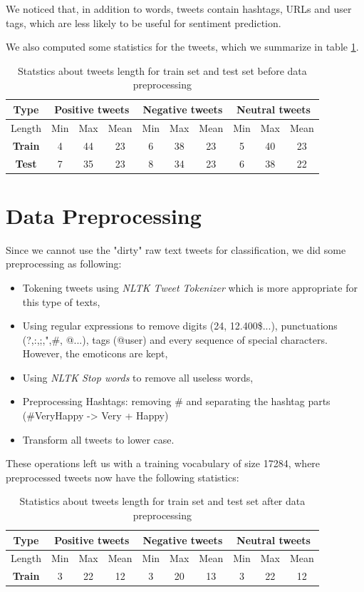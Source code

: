 \documentclass[a4paper,english,12pt]{article}
\begin{document}
We noticed that, in addition to words, tweets contain hashtags, URLs and user tags, which are less likely to be useful for sentiment prediction. 

We also computed some statistics for the tweets, which we summarize in table \ref{stat}.


\begin{table}[H]\centering
	\begin{tabular}{|c|c c c|c c c|c c c|}
		\hline \textbf{Type}  & \multicolumn{3}{|c|}{\textbf{Positive tweets}} & \multicolumn{3}{|c|}{\textbf{Negative tweets}} & \multicolumn{3}{|c|}{\textbf{Neutral tweets}}\\    \hline
		 Length & Min & Max & Mean & Min & Max & Mean & Min & Max & Mean\\   \hline
		\textbf{Train} & 4&44&23&6&38&23&5&40&23 \\
		\textbf{Test} & 7&35&23&8&34&23&6&38&22 \\
		\hline
	\end{tabular}
	\caption{Statstics about tweets length for train set and test set before data preprocessing}
	\label{stat}
\end{table}


\section{Data Preprocessing}
Since we cannot use the "dirty" raw text tweets for classification, we did some preprocessing as following:
\begin{itemize}
	\item Tokening tweets using \emph{NLTK Tweet Tokenizer} which is more appropriate for this type of texts,
	\item Using regular expressions to remove digits (24, 12.400\$...), punctuations (?,:,;,",\#, @...), tags (@user) and every sequence of special characters. However, the emoticons are kept,
	\item Using \emph{NLTK Stop words} to remove all useless words,
	\item Preprocessing Hashtags: removing \# and separating the hashtag parts (\#VeryHappy -> Very + Happy)
	\item Transform all tweets to lower case. 
\end{itemize}

These operations left us with a training vocabulary of size 17284, where preprocessed tweets now have the following statistics:


\begin{table}[H]\centering
	\begin{tabular}{|c|c c c|c c c|c c c|}
		\hline \textbf{Type}  & \multicolumn{3}{|c|}{\textbf{Positive tweets}} & \multicolumn{3}{|c|}{\textbf{Negative tweets}} & \multicolumn{3}{|c|}{\textbf{Neutral tweets}}\\    \hline
		Length & Min & Max & Mean & Min & Max & Mean & Min & Max & Mean\\   \hline
		\textbf{Train} & 3&22&12&3&20&13&3&22&12 \\
		\hline
	\end{tabular}
	\caption{Statistics about tweets length for train set and test set after data preprocessing}
\end{table}
\end{document}
